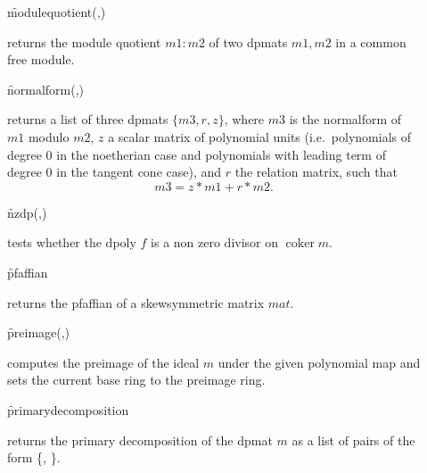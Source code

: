 \begin{description}
\item[]
  \begin{syntax}
    \f{modulequotient}(,)
  \end{syntax}
  \hypertarget{operator:MODULEQUOTIENT}{}
returns the module quotient $m1:m2$ of two dpmats $m1,m2$ in a
common free module.

\item[]
  \begin{syntax}
    \f{normalform}(,)
  \end{syntax}
  \hypertarget{operator:NORMALFORM}{}
returns a list of three dpmats $\{m3,r,z\}$, where $m3$ is the
normalform of $m1$ modulo $m2$, $z$ a scalar matrix of polynomial
units (i.e.\ polynomials of degree 0 in the noetherian case and
polynomials with leading term of degree 0 in the tangent cone case),
and $r$ the relation matrix, such that \[m3=z*m1+r*m2.\]

\item[]
  \begin{syntax}
    \f{nzdp}(,)
  \end{syntax}
  \hypertarget{operator:NZDP}{}
tests whether the dpoly $f$ is a non zero divisor on $\mathop{\mathrm{coker}}
m$.

\item[]
  \begin{syntax}
    \f{pfaffian} 
  \end{syntax}
  \hypertarget{operator:PFAFFIAN}{}
returns the pfaffian of a skewsymmetric matrix $mat$.

\item[]
  \begin{syntax}
    \f{preimage}(,)
  \end{syntax}
  \hypertarget{operator:PREIMAGE}{}
  computes the preimage of the ideal $m$ under the given
polynomial map and sets the current base ring to the preimage ring.

\item[]
  \begin{syntax}
    \f{primarydecomposition} 
  \end{syntax}
  \hypertarget{operator:PRIMARYDECOMPOSITION}{}
  returns the primary decomposition of the dpmat $m$ as a list of
  pairs of the form
\{, \}.


\end{description}
